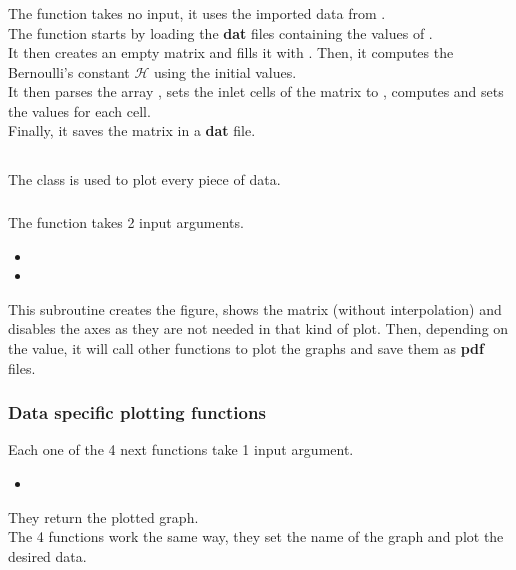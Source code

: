 \subsubsection{\textcolor{func}{}}
The function  takes no input, it uses the imported data
from .\\
The function starts by loading the \textbf{dat} files containing the values of
.\\
It then creates an empty matrix  and fills it with .
Then, it computes the Bernoulli's constant $\mathcal{H}$ using the initial
values.\\
It then parses the array , sets the inlet cells of the
 matrix to , computes and sets the values for
each cell.\\
Finally, it saves the matrix in a \textbf{dat} file.

\subsection{}
The class is used to plot every piece of data.

\subsubsection{\textcolor{func}{}}
The function  takes 2 input arguments.
\begin{itemize}
      \item {}
      \item {}
\end{itemize}
This subroutine creates the figure, shows the matrix  (without
interpolation) and disables the axes as they are not needed in that kind of
plot. Then, depending on the  value, it will call other 
functions to plot the graphs and save them as \textbf{pdf} files.

\subsubsection{Data specific plotting functions}
Each one of the 4 next functions take 1 input argument.
\begin{itemize}
      \item {}
\end{itemize}
They return the plotted graph.\\
The 4 functions work the same way, they set the name of the graph and plot the
desired data.
\cite{potential-flow}
\newpage
\begin{multicols}{2}
    [\center{\printbibheading}]
    \printbibliography[heading=none]
\end{multicols}
